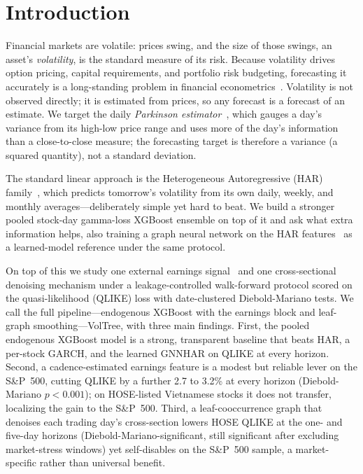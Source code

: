 \documentclass[runningheads,a4paper]{llncs}
\begin{document}
\section{Introduction}
Financial markets are volatile: prices swing, and the size of those swings, an asset's
\emph{volatility}, is the standard measure of its risk. Because volatility drives option
pricing, capital requirements, and portfolio risk budgeting, forecasting
it accurately is a long-standing problem in financial econometrics~\cite{corsi2009}. Volatility is
not observed directly; it is estimated from prices, so any forecast is a forecast of an estimate. We
target the daily \emph{Parkinson estimator}~\cite{parkinson1980}, which gauges a day's variance from
its high-low price range and uses more of the day's information than a close-to-close measure; the
forecasting target is therefore a variance (a squared quantity), not a standard deviation.

The standard linear approach is the Heterogeneous Autoregressive (HAR) family~\cite{corsi2009}, which predicts
tomorrow's volatility from its own daily, weekly, and monthly averages---deliberately simple yet hard to
beat. We build a stronger pooled stock-day gamma-loss XGBoost ensemble on top of it and ask what extra
information helps, also training a graph neural network on the HAR features~\cite{gnnhar2024} as a
learned-model reference under the same protocol.

On top of this we study one external earnings signal~\cite{patell1981} and one cross-sectional denoising
mechanism under a leakage-controlled walk-forward protocol scored on the quasi-likelihood (QLIKE) loss with date-clustered
Diebold-Mariano tests. We call the full pipeline---endogenous XGBoost with the earnings block and
leaf-graph smoothing---VolTree, with three main findings. First, the pooled endogenous XGBoost
model is a strong, transparent baseline that beats HAR, a per-stock GARCH, and the learned GNNHAR on QLIKE
at every horizon. Second, a cadence-estimated earnings feature is a modest but reliable lever on the
S\&P~500, cutting QLIKE by a further 2.7 to 3.2\% at every horizon (Diebold-Mariano $p<0.001$); on
HOSE-listed Vietnamese stocks it does not transfer, localizing the gain to the S\&P~500. Third, a leaf-cooccurrence
graph that denoises each trading day's cross-section lowers HOSE QLIKE at the one- and five-day horizons
(Diebold-Mariano-significant, still significant after excluding market-stress windows) yet self-disables on
the S\&P~500 sample, a market-specific rather than universal benefit.
\end{document}
